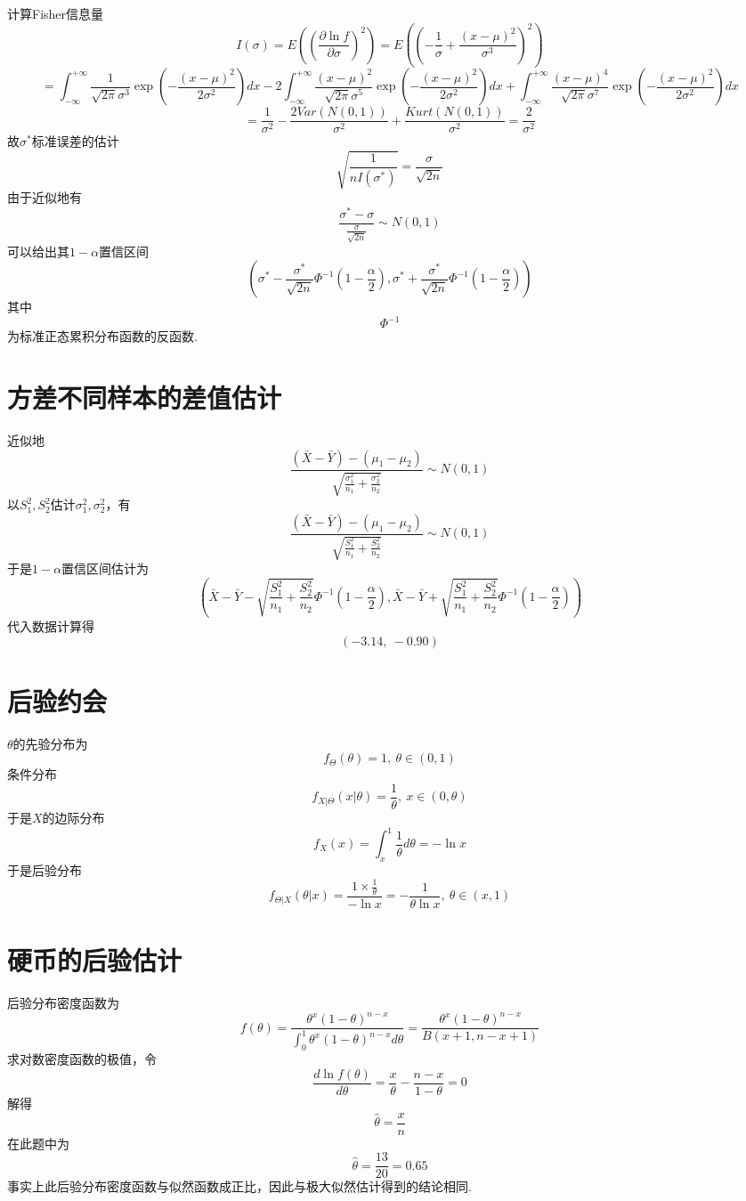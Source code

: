 \documentclass{article}
\begin{document}
\begin{CJK}{UTF8}{gbsn}
\subsection{}
计算Fisher信息量
$$ I(\sigma)=E((\frac{\partial\ln f}{\partial\sigma})^{2})=E((-\frac{1}{\sigma}+\frac{(x-\mu)^{2}}{\sigma^{3}})^{2})$$
$$ =\int_{-\infty}^{+\infty}\frac{1}{\sqrt{2\pi}\sigma^{3}}\exp(-\frac{(x-\mu)^{2}}{2\sigma^{2}})dx-2\int_{-\infty}^{+\infty}\frac{(x-\mu)^{2}}{\sqrt{2\pi}\sigma^{5}}\exp(-\frac{(x-\mu)^{2}}{2\sigma^{2}})dx+\int_{-\infty}^{+\infty}\frac{(x-\mu)^{4}}{\sqrt{2\pi}\sigma^{7}}\exp(-\frac{(x-\mu)^{2}}{2\sigma^{2}})dx$$
$$ =\frac{1}{\sigma^{2}}-\frac{2Var(N(0,1))}{\sigma^{2}}+\frac{Kurt(N(0,1))}{\sigma^{2}}=\frac{2}{\sigma^{2}}$$
故$\sigma^{*}$标准误差的估计
$$ \sqrt{\frac{1}{nI(\sigma^{*})}}=\frac{\sigma}{\sqrt{2n}}$$
由于近似地有
$$ \frac{\sigma^{*}-\sigma}{\frac{\sigma}{\sqrt{2n}}}\sim N(0,1)$$
可以给出其$1-\alpha$置信区间
$$ (\sigma^{*}-\frac{\sigma^{*}}{\sqrt{2n}}\Phi^{-1}(1-\frac{\alpha}{2}),\sigma^{*}+\frac{\sigma^{*}}{\sqrt{2n}}\Phi^{-1}(1-\frac{\alpha}{2})) $$
其中
$$ \Phi^{-1} $$
为标准正态累积分布函数的反函数.
\section{方差不同样本的差值估计}
近似地
$$ \frac{(\bar{X}-\bar{Y})-(\mu_{1}-\mu_{2})}{\sqrt{\frac{\sigma_{1}^{2}}{n_{1}}+\frac{\sigma_{2}^{2}}{n_{2}}}}\sim N(0,1)$$
以$S_{1}^{2},S_{2}^{2}$估计$\sigma_{1}^{2},\sigma_{2}^{2}$，有
$$ \frac{(\bar{X}-\bar{Y})-(\mu_{1}-\mu_{2})}{\sqrt{\frac{S_{1}^{2}}{n_{1}}+\frac{S_{2}^{2}}{n_{2}}}}\sim N(0,1)$$
于是$1-\alpha$置信区间估计为
$$ (\bar{X}-\bar{Y}-\sqrt{\frac{S_{1}^{2}}{n_{1}}+\frac{S_{2}^{2}}{n_{2}}}\Phi^{-1}(1-\frac{\alpha}{2}),\bar{X}-\bar{Y}+\sqrt{\frac{S_{1}^{2}}{n_{1}}+\frac{S_{2}^{2}}{n_{2}}}\Phi^{-1}(1-\frac{\alpha}{2})) $$
代入数据计算得
$$ (-3.14,\ -0.90) $$
\section{后验约会}
$\theta$的先验分布为
$$ f_{\Theta}(\theta)=1,\ \theta\in(0,1)$$
条件分布
$$ f_{X|\Theta}(x|\theta)=\frac{1}{\theta},\ x\in(0,\theta)$$
于是$X$的边际分布
$$ f_{X}(x)=\int_{x}^{1}\frac{1}{\theta}d\theta=-\ln x $$
于是后验分布
$$ f_{\Theta|X}(\theta|x)=\frac{1\times\frac{1}{\theta}}{-\ln x}=-\frac{1}{\theta\ln x},\ \theta\in(x,1)$$
\section{硬币的后验估计}
后验分布密度函数为
$$ f(\theta)=\frac{\theta^{x}(1-\theta)^{n-x}}{\int_{0}^{1}\theta^{x}(1-\theta)^{n-x}d\theta}=\frac{\theta^{x}(1-\theta)^{n-x}}{B(x+1,n-x+1)}$$
求对数密度函数的极值，令
$$ \frac{d\ln f(\theta)}{d\theta}=\frac{x}{\theta}-\frac{n-x}{1-\theta}=0$$
解得
$$ \hat{\theta}=\frac{x}{n}$$
在此题中为
$$ \hat{\theta}=\frac{13}{20}=0.65 $$
事实上此后验分布密度函数与似然函数成正比，因此与极大似然估计得到的结论相同.

\end{CJK}
\end{document}
